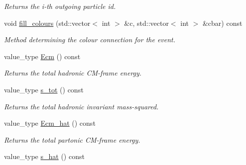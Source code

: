 \begin{DoxyCompactItemize}
\begin{DoxyCompactList}\small\item\em Returns the i-\/th outgoing particle id. \end{DoxyCompactList}\item 
\hypertarget{a00430_a54043a6b6773beba5cb69313b9b589de}{void \hyperlink{a00430_a54043a6b6773beba5cb69313b9b589de}{fill\-\_\-colours} (std\-::vector$<$ int $>$ \&c, std\-::vector$<$ int $>$ \&cbar) const }\label{a00430_a54043a6b6773beba5cb69313b9b589de}

\begin{DoxyCompactList}\small\item\em Method determining the colour connection for the event. \end{DoxyCompactList}\item 
\hypertarget{a00430_a4a9bd85b0a539cf576967af09fd62bf0}{value\-\_\-type \hyperlink{a00430_a4a9bd85b0a539cf576967af09fd62bf0}{Ecm} () const }\label{a00430_a4a9bd85b0a539cf576967af09fd62bf0}

\begin{DoxyCompactList}\small\item\em Returns the total hadronic C\-M-\/frame energy. \end{DoxyCompactList}\item 
\hypertarget{a00430_ac6e6f23d9fce776fe68c6e186053e4f2}{value\-\_\-type \hyperlink{a00430_ac6e6f23d9fce776fe68c6e186053e4f2}{s\-\_\-tot} () const }\label{a00430_ac6e6f23d9fce776fe68c6e186053e4f2}

\begin{DoxyCompactList}\small\item\em Returns the total hadronic invariant mass-\/squared. \end{DoxyCompactList}\item 
\hypertarget{a00430_a54c63596949efb310049f3e28d216fa6}{value\-\_\-type \hyperlink{a00430_a54c63596949efb310049f3e28d216fa6}{Ecm\-\_\-hat} () const }\label{a00430_a54c63596949efb310049f3e28d216fa6}

\begin{DoxyCompactList}\small\item\em Returns the total partonic C\-M-\/frame energy. \end{DoxyCompactList}\item 
\hypertarget{a00430_aa286957f1fbbf236cbc6b92c53137054}{value\-\_\-type \hyperlink{a00430_aa286957f1fbbf236cbc6b92c53137054}{s\-\_\-hat} () const }\label{a00430_aa286957f1fbbf236cbc6b92c53137054}


\end{DoxyCompactItemize}
